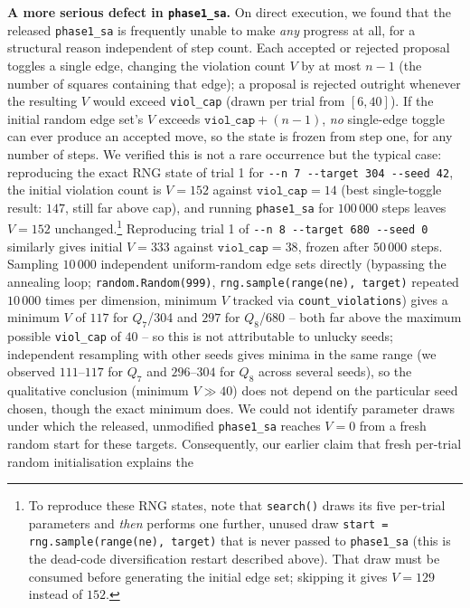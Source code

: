 \documentclass[12pt]{article}
\begin{document}
\noindent\textbf{A more serious defect in \texttt{phase1\_sa}.} On
direct execution, we found that the released \texttt{phase1\_sa} is
frequently unable to make \emph{any} progress at all, for a structural
reason independent of step count. Each accepted or rejected proposal
toggles a single edge, changing the violation count $V$ by at most
$n-1$ (the number of squares containing that edge); a proposal is
rejected outright whenever the resulting $V$ would exceed
\texttt{viol\_cap} (drawn per trial from $[6,40]$). If the initial
random edge set's $V$ exceeds $\texttt{viol\_cap}+(n-1)$, \emph{no}
single-edge toggle can ever produce an accepted move, so the state is
frozen from step one, for any number of steps. We verified this is not
a rare occurrence but the typical case: reproducing the exact RNG state
of trial 1 for \texttt{-{}-n 7 -{}-target 304 -{}-seed 42}, the initial
violation count is $V=152$ against $\texttt{viol\_cap}=14$ (best
single-toggle result: $147$, still far above cap), and running
\texttt{phase1\_sa} for $100\,000$ steps leaves $V=152$ unchanged.\footnote{To
reproduce these RNG states, note that \texttt{search()} draws its five
per-trial parameters and \emph{then} performs one further, unused draw
\texttt{start = rng.sample(range(ne), target)} that is never passed to
\texttt{phase1\_sa} (this is the dead-code diversification restart described
above). That draw must be consumed before generating the initial edge set;
skipping it gives $V=129$ instead of $152$.}
Reproducing trial 1 of \texttt{-{}-n 8 -{}-target 680 -{}-seed 0}
similarly gives initial $V=333$ against $\texttt{viol\_cap}=38$,
frozen after $50\,000$ steps. Sampling $10\,000$ independent uniform-random
edge sets directly (bypassing the annealing loop; \texttt{random.Random(999)},
\texttt{rng.sample(range(ne), target)} repeated $10\,000$ times per
dimension, minimum $V$ tracked via \texttt{count\_violations}) gives a
minimum $V$
of $117$ for $Q_7$/304 and $297$ for $Q_8$/680 -- both far above the
maximum possible \texttt{viol\_cap} of $40$ -- so this is not
attributable to unlucky seeds; independent resampling with other seeds
gives minima in the same range (we observed $111$--$117$ for $Q_7$ and
$296$--$304$ for $Q_8$ across several seeds), so the qualitative
conclusion (minimum $V\gg40$) does not depend on the particular seed
chosen, though the exact minimum does. We could not identify parameter draws
under which the released, unmodified \texttt{phase1\_sa} reaches
$V=0$ from a fresh random start for these targets. Consequently, our
earlier claim that fresh per-trial random initialisation explains the
\end{document}
